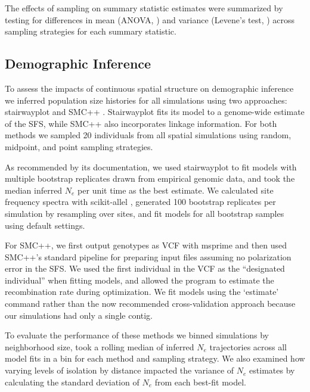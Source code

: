 \documentclass[10pt,twoside,lineno,hidelinks]{preprint}
\begin{document}
The effects of sampling on summary statistic estimates were summarized by testing for differences in mean (ANOVA, \citet{Rcore2018}) and variance (Levene's test, \citet{Fox2011}) across sampling strategies for each summary statistic. 


\subsection{Demographic Inference}


To assess the impacts of continuous spatial structure on demographic inference we inferred population size histories for all simulations using two approaches: stairwayplot \citep{Liu2015} and SMC++ \citep{Terhorst2016}. Stairwayplot fits its model to a genome-wide estimate of the SFS, while SMC++ also incorporates linkage information. %
For both methods we sampled 20 individuals from all spatial simulations using random, midpoint, and point sampling strategies. 

As recommended by its documentation, we used stairwayplot to fit models with multiple bootstrap replicates drawn from empirical genomic data, and took the median inferred $N_{e}$ per unit time as the best estimate. We calculated site frequency spectra with scikit-allel \citep{Miles2017}, generated 100 bootstrap replicates per simulation by resampling over sites, and fit models for all bootstrap samples using default settings.

For SMC++, we first output genotypes as VCF with msprime and then used SMC++'s standard pipeline for preparing input files assuming no polarization error in the SFS. We used the first individual in the VCF as the ``designated individual'' when fitting models, and allowed the program to estimate the recombination rate during optimization. We fit models using the `estimate' command rather than the now recommended cross-validation approach because our simulations had only a single contig. 

To evaluate the performance of these methods we binned simulations by neighborhood size, took a rolling median of inferred $N_{e}$ trajectories across all model fits in a bin for each method and sampling strategy.  We also examined how varying levels of isolation by distance impacted the variance of $N_{e}$ estimates by calculating the standard deviation of $N_{e}$ from each best-fit model. %
\end{document}
